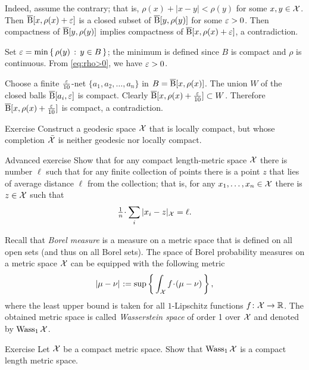 Indeed, 
assume the contrary; that is, $\rho(x)+|x-y|<\rho(y)$ for some $x,y\in \mathcal{X}$. 
Then 
$\overline{\mathrm{B}}{}[x,\rho(x)+\varepsilon]$ is a closed subset of $\overline{\mathrm{B}}{}[y,\rho(y)]$ for some $\varepsilon>0$.
Then  compactness of $\overline{\mathrm{B}}{}[y,\rho(y)]$ implies compactness of $\overline{\mathrm{B}}{}[x,\rho(x)+\varepsilon]$, a contradiction.\claimqeds

Set $\varepsilon=\min\left\{\,{\rho(y)}\,:\,{y\in B}\,\right\}$; the minimum is defined since $B$ is compact and $\rho$ is continuous.
From \ref{eq:rho>0}, we have $\varepsilon>0$.

Choose a finite $\tfrac{\varepsilon}{10}$-net $\{a_1,a_2,\dots,a_n\}$ in $B=\overline{\mathrm{B}}{}[x,\rho(x)]$.
The union $W$ of the closed balls $\overline{\mathrm{B}}{}[a_i,\varepsilon]$ is compact.
Clearly 
$\overline{\mathrm{B}}{}[x,\rho(x)+\frac{\varepsilon}{10}]\subset W$.
Therefore $\overline{\mathrm{B}}{}[x,\rho(x)+\frac{\varepsilon}{10}]$ is compact,
a contradiction.
\qeds

\begin{thm}{Exercise}\label{exercise from BH}
Construct a geodesic space $\mathcal{X}$ that is locally compact,
but whose completion $\bar{\mathcal{X}}$ is neither geodesic nor locally compact.
\end{thm}


\begin{thm}{Advanced exercise}\label{ex:gross}
Show that for any compact length-metric space $\mathcal{X}$ there is number $\ell$ such that for any finite collection of points there is a point $z$ that lies of average distance $\ell$ from the collection;
that is, for any $x_1,\dots,x_n\in \mathcal{X}$ there is $z\in \mathcal{X}$ such that
\[\tfrac1n\cdot\sum_i|x_i-z|_{\spc{X}}=\ell.\]
\end{thm}


Recall that \emph{Borel measure} is a measure on a metric space that is defined on all open sets (and thus on all Borel sets).
The space of Borel probability measures on a metric space $\mathcal{X}$ can be equipped with the following metric 
\[\dist{\mu}{\nu}{}\df\sup\left\{\,\int_{\spc{X}} f\cdot(\mu-\nu)\,\right\},\]
where the least upper bound is taken for all $1$-Lipschitz functions $f\colon\mathcal{X}\to\mathbb{R}$.
The obtained metric space is called \emph{Wasserstein space} of order 1 over $\mathcal{X}$ and denoted by $\operatorname{\rm Wass}\nolimits_1\mathcal{X}$.

\begin{thm}{Exercise}
Let $\mathcal{X}$ be a compact metric space.
Show that $\operatorname{\rm Wass}\nolimits_1\mathcal{X}$ is a compact length metric space.
\end{thm}





